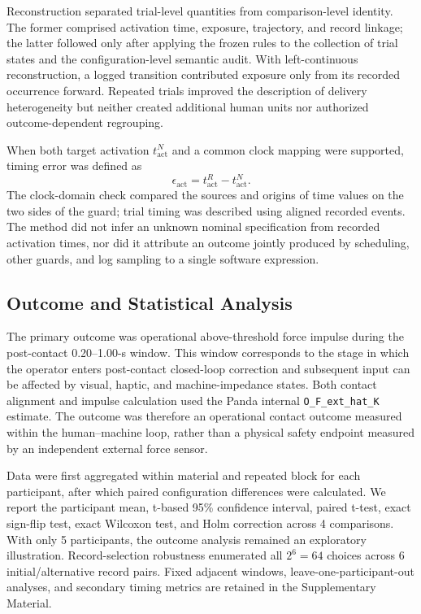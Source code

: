 \documentclass[journal]{IEEEtran}
\begin{document}
Reconstruction separated trial-level quantities from comparison-level
identity. The former comprised activation time, exposure, trajectory, and
record linkage; the latter followed only after applying the frozen rules to
the collection of trial states and the configuration-level semantic audit.
With left-continuous reconstruction, a logged transition contributed exposure
only from its recorded occurrence forward. Repeated trials improved the
description of delivery heterogeneity but neither created additional human
units nor authorized outcome-dependent regrouping.

When both target activation $t^N_{\mathrm{act}}$ and a common clock mapping
were supported, timing error was defined as
\begin{equation}
\epsilon_{\mathrm{act}}=t^R_{\mathrm{act}}-t^N_{\mathrm{act}}.
\label{eq:timing_error}
\end{equation}
The clock-domain check compared the sources and origins of time values on the
two sides of the guard; trial timing was described using aligned recorded
events. The method did not infer an unknown nominal specification from
recorded activation times, nor did it attribute an outcome jointly produced by
scheduling, other guards, and log sampling to a single software expression.

\subsection{Outcome and Statistical Analysis}

The primary outcome was operational above-threshold force impulse during the
post-contact 0.20--1.00-s window. This window corresponds to the stage in
which the operator enters post-contact closed-loop correction and subsequent
input can be affected by visual, haptic, and machine-impedance states. Both
contact alignment and impulse calculation used the Panda internal
\texttt{O\_F\_ext\_hat\_K} estimate. The outcome was therefore an operational
contact outcome measured within the human--machine loop, rather than a physical
safety endpoint measured by an independent external force sensor.

Data were first aggregated within material and repeated block for each
participant, after which paired configuration differences were calculated. We
report the participant mean, t-based 95\% confidence interval, paired t-test,
exact sign-flip test, exact Wilcoxon test, and Holm correction across 4
comparisons. With only 5 participants, the outcome analysis remained an
exploratory illustration. Record-selection robustness enumerated all
$2^6=64$ choices across 6 initial/alternative record pairs. Fixed adjacent
windows, leave-one-participant-out analyses, and secondary timing metrics are
retained in the Supplementary Material.
\end{document}
